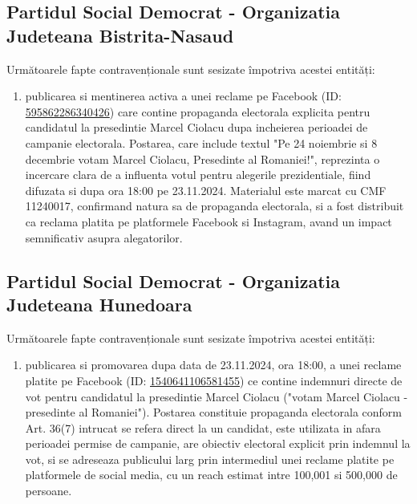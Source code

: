\documentclass[a4paper,12pt]{article}
\begin{document}
\vspace{0.5cm}

\subsection{Partidul Social Democrat - Organizatia Judeteana Bistrita-Nasaud}
Următoarele fapte contravenționale sunt sesizate împotriva acestei entități:

\begin{enumerate}[leftmargin=*, label=\arabic*.)]
    \item publicarea si mentinerea activa a unei reclame pe Facebook (ID: \href{https://www.facebook.com/ads/library/?id=595862286340426}{595862286340426}) care contine propaganda electorala explicita pentru candidatul la presedintie Marcel Ciolacu dupa incheierea perioadei de campanie electorala. Postarea, care include textul "Pe 24 noiembrie si 8 decembrie votam  Marcel Ciolacu, Presedinte al Romaniei!", reprezinta o incercare clara de a influenta votul pentru alegerile prezidentiale, fiind difuzata si dupa ora 18:00 pe 23.11.2024. Materialul este marcat cu CMF 11240017, confirmand natura sa de propaganda electorala, si a fost distribuit ca reclama platita pe platformele Facebook si Instagram, avand un impact semnificativ asupra alegatorilor.
\end{enumerate}

\vspace{0.5cm}

\subsection{Partidul Social Democrat - Organizatia Judeteana Hunedoara}
Următoarele fapte contravenționale sunt sesizate împotriva acestei entități:

\begin{enumerate}[leftmargin=*, label=\arabic*.)]
    \item publicarea si promovarea dupa data de 23.11.2024, ora 18:00, a unei reclame platite pe Facebook (ID: \href{https://www.facebook.com/ads/library/?id=1540641106581455}{1540641106581455}) ce contine indemnuri directe de vot pentru candidatul la presedintie Marcel Ciolacu ("votam Marcel Ciolacu - presedinte al Romaniei"). Postarea constituie propaganda electorala conform Art. 36(7) intrucat se refera direct la un candidat, este utilizata in afara perioadei permise de campanie, are obiectiv electoral explicit prin indemnul la vot, si se adreseaza publicului larg prin intermediul unei reclame platite pe platformele de social media, cu un reach estimat intre 100,001 si 500,000 de persoane.
\end{enumerate}
\end{document}
